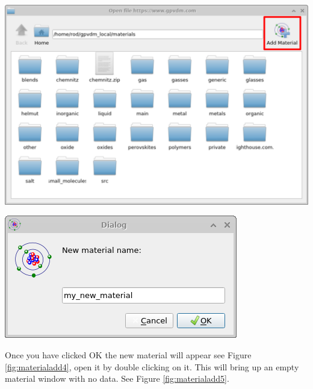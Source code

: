 \begin{minipage}{0.5\textwidth}
	\centering
	\includegraphics[width=\linewidth,height=0.8\linewidth]{./images/database_materials/database_materials_add.png}
	\label{fig:materialadd2}
\end{minipage}
\hspace{4pt}
\begin{minipage}[]{0.5\linewidth}
	\centering
	\includegraphics[width=\linewidth,height=0.6\linewidth]{./images/database_materials/database_materials_set_name.png}
	\label{fig:materialadd3}
\end{minipage}
Once you have clicked OK the new material will appear see Figure \ref{fig:materialadd4}, open it by double clicking on it. This will bring up an empty material window with no data. See Figure \ref{fig:materialadd5}.

